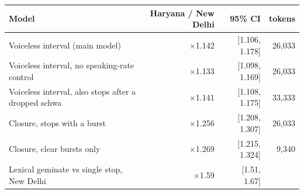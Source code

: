 \begin{tabularx}{\linewidth}{@{}>{\raggedright\arraybackslash}Xrrr@{}}
\toprule
Model & Haryana / New Delhi & 95\% CI & tokens \\
\midrule
Voiceless interval (main model) & $\times$1.142 & [1.106, 1.178] & 26,033 \\
Voiceless interval, no speaking-rate control & $\times$1.133 & [1.098, 1.169] & 26,033 \\
Voiceless interval, also stops after a dropped schwa & $\times$1.141 & [1.108, 1.175] & 33,333 \\
Closure, stops with a burst & $\times$1.256 & [1.208, 1.307] & 26,033 \\
Closure, clear bursts only & $\times$1.269 & [1.215, 1.324] & 9,340 \\
\midrule
Lexical geminate vs single stop, New Delhi & $\times$1.59 & [1.51, 1.67] & \\
\bottomrule
\end{tabularx}
